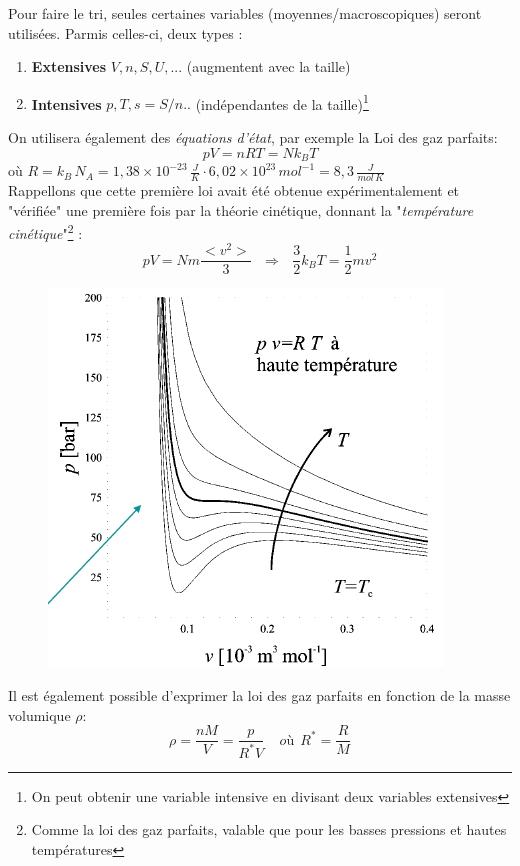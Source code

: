 \documentclass[11pt, a4paper, openany]{book}
\begin{document}
Pour faire le tri, seules certaines variables (moyennes/macroscopiques) seront utilisées. Parmis celles-ci, deux types :
\begin{enumerate}
\item \textbf{Extensives} $V, n, S, U, ...$ (augmentent avec la taille)
\item \textbf{Intensives} $p, T, s = S/n..$ (indépendantes de la taille)\footnote{On peut obtenir une variable intensive en divisant deux variables extensives}
\end{enumerate}
On utilisera également des \textit{équations d'état}, par exemple la Loi des gaz parfaits:
\begin{equation}
pV = nRT = Nk_BT
\end{equation}
où $R =k_B\,N_A=1,38\times 10^{-23}\,\frac{J}{K}\cdot 6,02\times 10^{23}\,mol^{-1}=8,3\,\frac{J}{mol\, K}$\\
Rappellons que cette première loi avait été obtenue expérimentalement et "vérifiée" une première fois par la théorie cinétique, donnant la "\textit{température cinétique}"\footnote{Comme la loi des gaz parfaits, valable que pour les basses pressions et hautes températures} :
\begin{equation}
pV = Nm\frac{<v^2>}{3}\ \ \ \Rightarrow\ \ \ \frac{3}{2}k_BT = \frac{1}{2}mv^2
\end{equation}
\begin{figure}
\includegraphics[scale=0.5]{cp/image2.png}
\end{figure}
Il est également possible d'exprimer la loi des gaz parfaits en fonction de la masse volumique $\rho$:
\begin{equation}
\rho = \frac{nM}{V} = \frac{p}{R^*V}\ \ \ \ \ où\ \ R^* = \frac{R}{M}
\end{equation}
\end{document}
